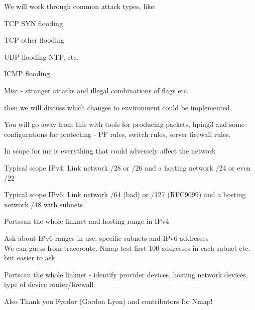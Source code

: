 \documentclass[Screen16to9,17pt]{foils}
\begin{document}

We will work through common attack types, like:

\begin{list2}
\item TCP SYN flooding
\item TCP other flooding
\item UDP flooding NTP, etc.
\item ICMP flooding
\item Misc - stranger attacks and illegal combinations of flags etc.
\end{list2}

then we will discuss which changes to environment could be implemented.

You will go away from this with tools for producing packets, hping3 and some configurations for protecting - PF rules, switch rules, server firewall rules.






\begin{list2}
\item In scope for me is everything that could adversely affect the network
\item Typical scope IPv4: Link network /28 or /26 and a hosting network /24 or even /22
\item Typical scope IPv6: Link network /64 (bad) or /127 (RFC9099) and a hosting network /48 with subnets
\end{list2}






\begin{list2}
\item Portscan the whole linknet and hosting range in IPv4
\item Ask about IPv6 ranges in use, specific subnets and IPv6 addresses\\
We can guess from traceroute, Nmap test first 100 addresses in each subnet etc. but easier to ask
\item Portscan the whole linknet - identify provider devices, hosting network devices, type of device router/firewall
\item Also Thank you Fyodor (Gordon Lyon) and contributors for Nmap!
\end{list2}
\end{document}

